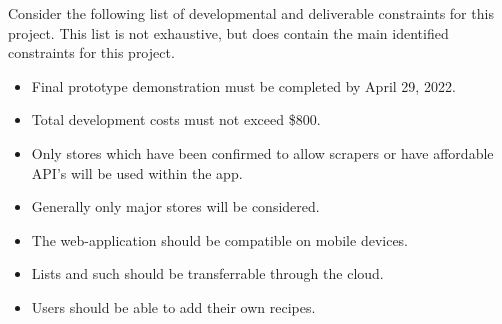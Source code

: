 %
%
%
%
%
Consider the following list of developmental and deliverable constraints for this project.  This list is not exhaustive, but does contain the main identified constraints for this project.
\begin{itemize}
  \item Final prototype demonstration must be completed by April 29, 2022.
  \item Total development costs must not exceed \$800.
  \item Only stores which have been confirmed to allow scrapers or have affordable API's will be used within the app.
  \item Generally only major stores will be considered.
  \item The web-application should be compatible on mobile devices.
  \item Lists and such should be transferrable through the cloud.
  \item Users should be able to add their own recipes.
\end{itemize}
